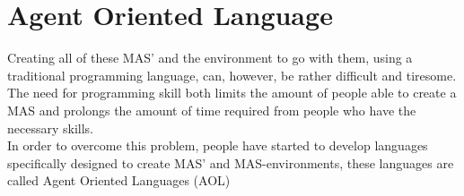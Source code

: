 \section{Agent Oriented Language}
Creating all of these MAS' and the environment to go with them, using a traditional programming language, can, however, be rather difficult and tiresome. The need for programming skill both limits the amount of people able to create a MAS and prolongs the amount of time required from people who have the necessary skills.\\
\indent In order to overcome this problem, people have started to develop languages specifically designed to create MAS' and MAS-environments, these languages are called Agent Oriented Languages (AOL)